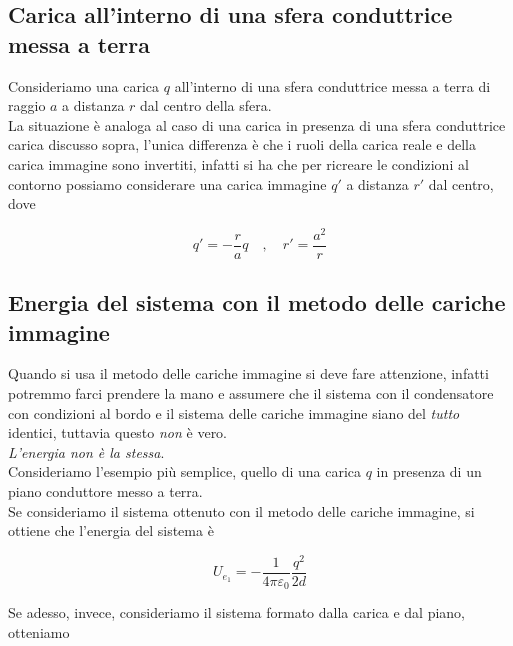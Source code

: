 \subsection{Carica all'interno di una sfera conduttrice messa a terra}

Consideriamo una carica $q$ all'interno di una sfera conduttrice messa a terra di raggio $a$ a distanza $r$ dal centro della sfera.\\

La situazione è analoga al caso di una carica in presenza di una sfera conduttrice carica discusso sopra, l'unica differenza è che i ruoli della carica reale e della carica immagine sono invertiti, infatti si ha che per ricreare le condizioni al contorno possiamo considerare una carica immagine $q'$ a distanza $r'$ dal centro, dove

\begin{tcolorbox}[colback=yellow!10!white, colframe=orange!70!black, boxrule=0.8pt]
\begin{equation}
    q' = -\frac{r}{a} q \quad , \quad r' = \frac{a^2}{r}
\end{equation}
\end{tcolorbox}

\subsection{Energia del sistema con il metodo delle cariche immagine}

Quando si usa il metodo delle cariche immagine si deve fare attenzione, infatti potremmo farci prendere la mano e assumere che il sistema con il condensatore con condizioni al bordo e il sistema delle cariche immagine siano del \emph{tutto} identici, tuttavia questo \emph{non} è vero. \\

\emph{L'energia non è la stessa}. \\

Consideriamo l'esempio più semplice, quello di una carica $q$ in presenza di un piano conduttore messo a terra. \\
Se consideriamo il sistema ottenuto con il metodo delle cariche immagine, si ottiene che l'energia del sistema è 

\begin{equation*}
    U_{e_1} = - \frac{1}{4 \pi \varepsilon_0} \frac{q^2}{2d}
\end{equation*}

Se adesso, invece, consideriamo il sistema formato dalla carica e dal piano, otteniamo 

